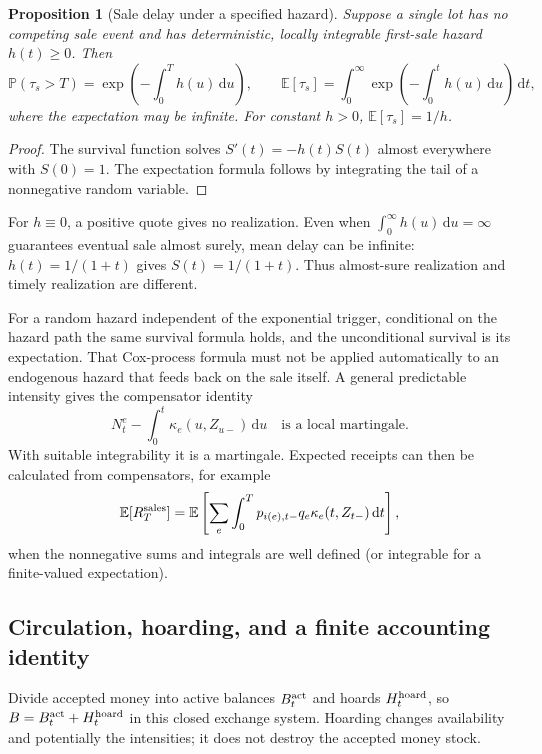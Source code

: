 \documentclass[11pt,letterpaper]{article}
\newtheorem{proposition}{Proposition}[section]
\newcommand{\E}{\mathbb E}
\newcommand{\Pp}{\mathbb P}
\newcommand{\dd}{\,\mathrm d}
\begin{document}
\begin{proposition}[Sale delay under a specified hazard]\label{prop:delay}
Suppose a single lot has no competing sale event and has deterministic,
locally integrable first-sale hazard $h(t)\ge0$. Then
\begin{equation}\label{eq:survival}
 \Pp(\tau_s>T)=\exp\left(-\int_0^T h(u)\dd u\right),
 \qquad
 \E[\tau_s]=\int_0^\infty
       \exp\left(-\int_0^t h(u)\dd u\right)\dd t,
\end{equation}
where the expectation may be infinite. For constant $h>0$,
$\E[\tau_s]=1/h$.
\end{proposition}
\begin{proof}
The survival function solves $S'(t)=-h(t)S(t)$ almost everywhere with
$S(0)=1$. The expectation formula follows by integrating the tail of
a nonnegative random variable.
\end{proof}
For $h\equiv0$, a positive quote gives no realization. Even when
$\int_0^\infty h(u)\dd u=\infty$ guarantees eventual sale almost surely,
mean delay can be infinite: $h(t)=1/(1+t)$ gives $S(t)=1/(1+t)$.
Thus almost-sure realization and timely realization are different.

For a random hazard independent of the exponential trigger, conditional
on the hazard path the same survival formula holds, and the unconditional
survival is its expectation. That Cox-process formula must not be
applied automatically to an endogenous hazard that feeds back on the
sale itself. A general predictable intensity gives the compensator
identity
\begin{equation}\label{eq:compensator}
 N^e_t-\int_0^t\kappa_e(u,Z_{u-})\dd u
 \quad\text{is a local martingale}.
\end{equation}
With suitable integrability it is a martingale. Expected receipts can
then be calculated from compensators, for example
\[
 \E[R_T^{\rm sales}]
 =\E\left[\sum_e\int_0^T
       p_{i(e),t-}q_e\kappa_e(t,Z_{t-})\dd t\right],
\]
when the nonnegative sums and integrals are well defined (or integrable
for a finite-valued expectation).

\subsection{Circulation, hoarding, and a finite accounting identity}
Divide accepted money into active balances $B_t^{\rm act}$ and hoards
$H_t^{\rm hoard}$, so $B=B_t^{\rm act}+H_t^{\rm hoard}$ in this closed
exchange system. Hoarding changes availability and potentially the
intensities; it does not destroy the accepted money stock.
\end{document}
